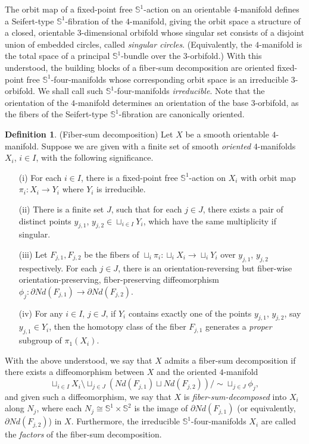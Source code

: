\documentclass[11pt]{amsart}
\theoremstyle{plain}
\numberwithin{theorem}{section}
\theoremstyle{definition}
\newtheorem{definition}[theorem]{Definition}
\begin{document}
The orbit map of a fixed-point free ${{\mathbb S}}^1$-action on an orientable $4$-manifold defines 
a Seifert-type ${{\mathbb S}}^1$-fibration of the $4$-manifold, giving the orbit space a structure of a closed, 
orientable $3$-dimensional orbifold whose singular set consists of a disjoint union of embedded circles,
called {\it singular circles}. (Equivalently, the $4$-manifold is the total space of a principal ${{\mathbb S}}^1$-bundle 
over the $3$-orbifold.) With this understood, 
the building blocks of a fiber-sum decomposition are oriented fixed-point free 
${{\mathbb S}}^1$-four-manifolds whose corresponding orbit space is an irreducible $3$-orbifold. We shall call 
such ${{\mathbb S}}^1$-four-manifolds {\it irreducible}. Note that the orientation of the $4$-manifold determines an orientation of the base $3$-orbifold, as the fibers of the Seifert-type ${{\mathbb S}}^1$-fibration are canonically 
oriented. 

\begin{definition}(Fiber-sum decomposition)
Let $X$ be a smooth orientable $4$-manifold. 
Suppose we are given with a finite set of smooth {\it oriented} $4$-manifolds $X_i$, $i\in I$, 
with the following significance.
\begin{itemize}
\item [{(i)}] For each $i\in I$, there is a fixed-point free ${{\mathbb S}}^1$-action on $X_i$ with orbit map
$\pi_i:X_i\rightarrow Y_i$ where $Y_i$ is irreducible. 
\item [{(ii)}] There is a finite set $J$, such that for each $j\in J$, there exists a pair of distinct points
$y_{j,1}$, $y_{j,2}\in \sqcup_{i\in I} Y_i$, which have the same multiplicity if singular.
\item [{(iii)}] Let $F_{j,1},F_{j,2}$ be the fibers of 
$\sqcup_i\pi_i:\sqcup_i X_i\rightarrow \sqcup_i Y_i$ over
$y_{j,1}$, $y_{j,2}$ respectively. For each $j\in J$, there is an orientation-reversing but fiber-wise 
orientation-preserving, fiber-preserving diffeomorphism 
$\phi_j: \partial Nd(F_{j,1})\rightarrow \partial Nd(F_{j,2})$.
\item [{(iv)}] For any $i\in I$, $j\in J$, if $Y_i$ contains exactly one of the points $y_{j,1}$,
$y_{j,2}$, say $y_{j,1}\in Y_i$, then the homotopy class of the fiber $F_{j,1}$ generates a
{\it proper} subgroup of $\pi_1(X_i)$.
\end{itemize}
With the above understood, we say that $X$ admits a fiber-sum decomposition if there exists a
diffeomorphism between $X$ and the oriented $4$-manifold 
$$
\sqcup_{i\in I} X_i\setminus \sqcup_{j\in J} (Nd(F_{j,1})\sqcup Nd(F_{j,2}))/\sim \sqcup_{j\in J}\phi_j,
$$
and given such a diffeomorphism, we say that $X$ is {\it fiber-sum-decomposed} into $X_i$ along
$N_j$, where each $N_j\cong {{\mathbb S}}^1\times{{\mathbb S}}^2$ is the image of $\partial Nd(F_{j,1})$ (or equivalently,
$\partial Nd(F_{j,2})$) in $X$. Furthermore, the irreducible ${{\mathbb S}}^1$-four-manifolds $X_i$
are called the {\it factors} of the fiber-sum decomposition.
\end{definition}
\end{document}
